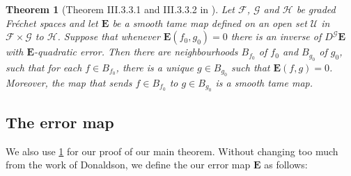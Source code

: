\documentclass[preprint,12pt]{elsarticle}
\numberwithin{table}{section}
\newtheorem{theorem}[lemma]{Theorem}
\newcommand{\Z}{\mathbb{Z}}
\begin{document}
\begin{theorem}[Theorem III.3.3.1 and III.3.3.2 in \cite{Hamilton1982}]
	\label{thm:hamilton}
	Let $\mathcal{F}$, $\mathcal{G}$ and $\mathcal{H}$ be graded Fr\'echet spaces and let $\mathbf{E}$ be a smooth tame map defined on an open set $\mathcal{U}$ in $\mathcal{F} \times \mathcal{G}$ to $\mathcal{H}$. Suppose that whenever $\mathbf{E}(f_0,g_0) = 0$ there is an inverse of $D^\mathcal{G} \mathbf{E}$ with $\mathbf{E}$-quadratic error. Then there are neighbourhoods $B_{f_0}$ of $f_0$ and $B_{g_0}$ of $g_0$, such that for each $f \in B_{f_0}$, there is a unique $g \in B_{g_0}$ such that $\mathbf{E}(f,g) = 0$. Moreover, the map that sends $f \in B_{f_0}$ to $g \in B_{g_0}$ is a smooth tame map.
\end{theorem}

\subsection{The error map}
\label{subsec:error-map}
We also use \cref{thm:hamilton} for our proof of our main theorem.
% 
% 
Without changing too much from the work of Donaldson, we define the our error map $\mathbf{E}$ as follows:
 
\end{document}
